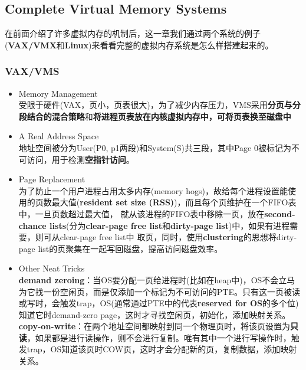 \documentclass{article}
\begin{document}
\subsection{Complete Virtual Memory Systems}
在前面介绍了许多虚拟内存的机制后，这一章我们通过两个系统的例子(\textbf{VAX/VMX}和\textbf{Linux})来看看完整的虚拟内存系统是怎么样搭建起来的。
\subsubsection{VAX/VMS}
\begin{itemize}
    \item Memory Management \\
    受限于硬件(VAX，页小，页表很大)，为了减少内存压力，VMS采用\textbf{分页与分段结合的混合策略}和\textbf{将进程页表放在内核虚拟内存中，可将页表换至磁盘中}
    \item A Real Address Space \\
    地址空间被分为User(P0, p1两段)和System(S)共三段，其中Page 0被标记为不可访问，用于检测\textbf{空指针访问}。
    \item Page Replacement \\
    为了防止一个用户进程占用太多内存(memory hogs)，故给每个进程设置能使用的页数最大值(\textbf{resident set size (RSS)})，而且每个页维护在一个FIFO表中，一旦页数超过最大值，
    就从该进程的FIFO表中移除一页，放在\textbf{second-chance lists}(分为\textbf{clear-page free list}和\textbf{dirty-page list})中，如果有进程需要，则可从clear-page free list中
    取页，同时，使用\textbf{clustering}的思想将dirty-page list的页聚集在一起写回磁盘，提高访问磁盘效率。
    \item Other Neat Tricks \\
    \textbf{demand zeroing}：当OS要分配一页给进程时(比如在heap中)，OS不会立马为它找一份空闲页，而是仅添加一个标记为不可访问的PTE。只有这一页被读或写时，会触发trap，OS(通常通过PTE中的代表\textbf{reserved for OS}的多个位)知道它时demand-zero page，这时才寻找空闲页，初始化，添加映射关系。 \\
    \textbf{copy-on-write}：在两个地址空间都映射到同一个物理页时，将该页设置为\textbf{只读}，如果都是进行读操作，则不会进行复制。唯有其中一个进行写操作时，触发trap，OS知道该页时COW页，这时才会分配新的页，复制数据，添加映射关系。

\end{itemize}
\end{document}
